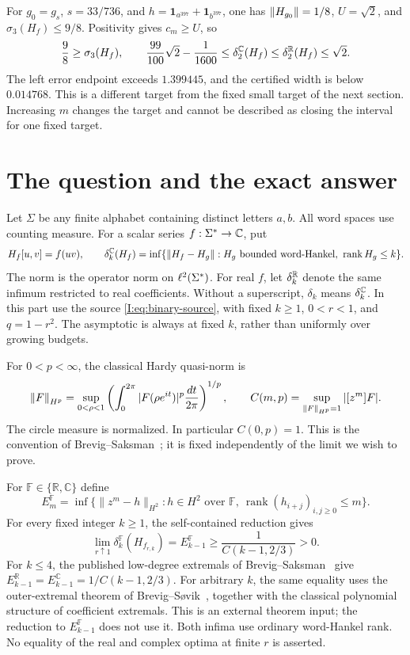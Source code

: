 For $g_0=g_s$, $s=33/736$, and $h=\mathbf1_{a^{397}}+\mathbf1_{b^{397}}$, one has $\left\lVert H_{g_0}\right\rVert=1/8$, $U=\sqrt2$, and $\sigma_3(H_f)\le9/8$. Positivity gives $c_m\ge U$, so
\[
 \frac98\ge\sigma_3(H_f),\qquad
 \frac{99}{100}\sqrt2-\frac1{1600}\le\delta_2^\mathbb C(H_f)
 \le\delta_2^\mathbb R(H_f)\le\sqrt2.
\]
The left error endpoint exceeds $1.399445$, and the certified width is below $0.014768$. This is a different target from the fixed small target of the next section. Increasing $m$ changes the target and cannot be described as closing the interval for one fixed target.

\section{The question and the exact answer}
Let $\Sigma$ be any finite alphabet containing distinct letters $a,b$. All word spaces use counting measure. For a scalar series $f:\Sigma^*\to\mathbb C$, put
\[
H_f[u,v]=f(uv),\qquad
\delta_k^{\mathbb C}(H_f)=\inf\{\left\lVert H_f-H_g\right\rVert:H_g\text{ bounded word-Hankel},\ \operatorname{rank} H_g\le k\}.
\]
The norm is the operator norm on $\ell^2(\Sigma^*)$. For real $f$, let $\delta_k^{\mathbb R}$ denote the same infimum restricted to real coefficients. Without a superscript, $\delta_k$ means $\delta_k^{\mathbb C}$. In this part use the source \eqref{I:eq:binary-source}, with fixed $k\ge1$, $0<r<1$, and $q=1-r^2$.
The asymptotic is always at fixed $k$, rather than uniformly over growing budgets.

For $0<p<\infty$, the classical Hardy quasi-norm is
\[
\left\lVert F\right\rVert_{H^p}=
\sup_{0<\rho<1}\left(\int_0^{2\pi}|F(\rho e^{it})|^p\frac{dt}{2\pi}\right)^{1/p},
\qquad C(m,p)=\sup_{\left\lVert F\right\rVert_{H^p}=1}|[z^m]F|.
\]
The circle measure is normalized. In particular $C(0,p)=1$. This is the convention of Brevig--Saksman~\cite{brevig2020}; it is fixed independently of the limit we wish to prove.

\begin{theorem}
\label{I:B:thm:main}
For $\mathbb F\in\{\mathbb R,\mathbb C\}$ define
\[
 E_m^{\mathbb F}=\inf\{\|z^m-h\|_{H^2}:h\in H^2\text{ over }\mathbb F,
                    \ \operatorname{rank}(h_{i+j})_{i,j\ge0}\le m\}.
\]
For every fixed integer $k\ge1$, the self-contained reduction gives
\[
 \boxed{\displaystyle\lim_{r\uparrow1}\delta_k^{\mathbb F}(H_{f_{r,k}})
       =E_{k-1}^{\mathbb F}\ge\frac1{C(k-1,2/3)}>0.}
\]
For $k\le4$, the published low-degree extremals of
Brevig--Saksman~\cite{brevig2020} give
$E_{k-1}^{\mathbb R}=E_{k-1}^{\mathbb C}=1/C(k-1,2/3)$.
For arbitrary $k$, the same equality uses the outer-extremal theorem
of Brevig--S\o vik~\cite{outer2026}, together with the classical
polynomial structure of coefficient extremals. This is an external
theorem input; the reduction to $E_{k-1}^{\mathbb F}$ does not use it.
Both infima use ordinary word-Hankel rank. No equality of the real and
complex optima at finite $r$ is asserted.
\end{theorem}

